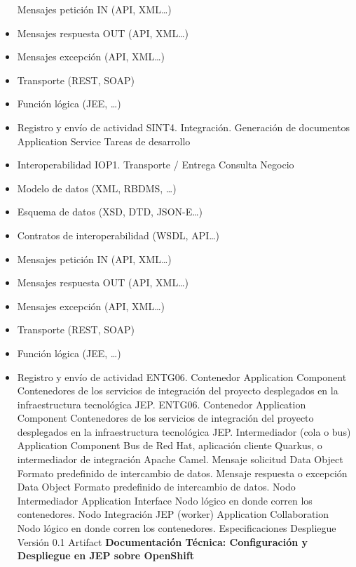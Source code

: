 \documentclass[
  paper=a4,
  ,captions=tableheading
]{scrartcl}
\begin{document}
\begin{itemize}
  Mensajes petición IN (API, XML\ldots)
\item
  Mensajes respuesta OUT (API, XML\ldots)
\item
  Mensajes excepción (API, XML\ldots)
\item
  Transporte (REST, SOAP)
\item
  Función lógica (JEE, \ldots)
\item
  Registro y envío de actividad \textbar{} \textbar{} SINT4.
  Integración. Generación de documentos \textbar{} Application Service
  \textbar{} Tareas de desarrollo
\item
  Interoperabilidad IOP1. Transporte / Entrega Consulta Negocio
\item
  Modelo de datos (XML, RBDMS, \ldots)
\item
  Esquema de datos (XSD, DTD, JSON-E\ldots)
\item
  Contratos de interoperabilidad (WSDL, API\ldots)
\item
  Mensajes petición IN (API, XML\ldots)
\item
  Mensajes respuesta OUT (API, XML\ldots)
\item
  Mensajes excepción (API, XML\ldots)
\item
  Transporte (REST, SOAP)
\item
  Función lógica (JEE, \ldots)
\item
  Registro y envío de actividad \textbar{} \textbar{} ENTG06. Contenedor
  \textbar{} Application Component \textbar{} Contenedores de los
  servicios de integración del proyecto desplegados en la
  infraestructura tecnológica JEP. \textbar{} \textbar{} ENTG06.
  Contenedor \textbar{} Application Component \textbar{} Contenedores de
  los servicios de integración del proyecto desplegados en la
  infraestructura tecnológica JEP. \textbar{} \textbar{} Intermediador
  (cola o bus) \textbar{} Application Component \textbar{} Bus de Red
  Hat, aplicación cliente Quarkus, o intermediador de integración Apache
  Camel. \textbar{} \textbar{} Mensaje solicitud \textbar{} Data Object
  \textbar{} Formato predefinido de intercambio de datos. \textbar{}
  \textbar{} Mensaje respuesta o excepción \textbar{} Data Object
  \textbar{} Formato predefinido de intercambio de datos. \textbar{}
  \textbar{} Nodo Intermediador \textbar{} Application Interface
  \textbar{} Nodo lógico en donde corren los contenedores. \textbar{}
  \textbar{} Nodo Integración JEP (worker) \textbar{} Application
  Collaboration \textbar{} Nodo lógico en donde corren los contenedores.
  \textbar{} \textbar{} Especificaciones Despliegue Versión 0.1
  \textbar{} Artifact \textbar{} \textbf{Documentación Técnica:
  Configuración y Despliegue en JEP sobre OpenShift}
\end{itemize}
\end{document}

